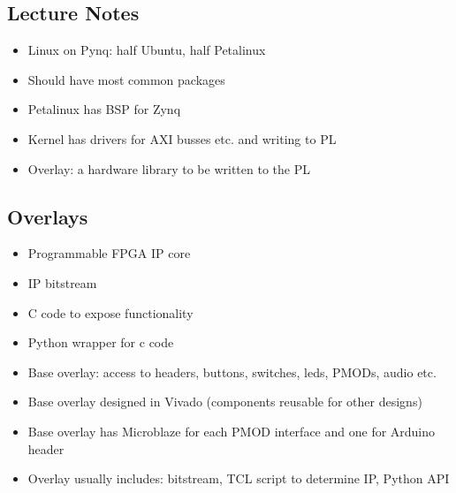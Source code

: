 \documentclass[12pt, letter]{article}
\begin{document}
\subsection*{Lecture Notes}
\begin{itemize}
	\item Linux on Pynq: half Ubuntu, half Petalinux
	\item Should have most common packages
	\item Petalinux has BSP for Zynq
	\item Kernel has drivers for AXI busses etc. and writing to PL
	\item Overlay: a hardware library to be written to the PL
\end{itemize}

\subsection*{Overlays}
\begin{itemize}
	\item Programmable FPGA IP core
	\item IP bitstream
	\item C code to expose functionality
	\item Python wrapper for c code
	\item Base overlay: access to headers, buttons, switches, leds, PMODs, audio etc.
	\item Base overlay designed in Vivado (components reusable for other designs)
	\item Base overlay has Microblaze for each PMOD interface and one for Arduino header
	\item Overlay usually includes: bitstream, TCL script to determine IP, Python API
\end{itemize}
\end{document}
